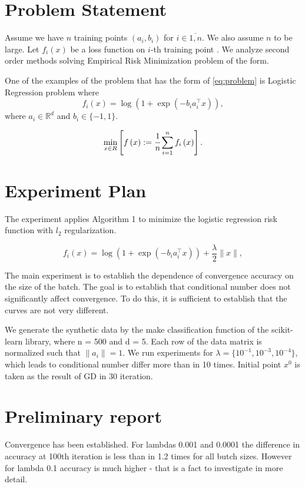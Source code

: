 \documentclass{article}
\begin{document}
\section{Problem Statement}

Assume we have $n$ training points $\left(a_i, b_i\right)$ for $i \in \overline{1, n}$. We also assume $n$ to be large. Let $f_i\left(x\right)$ be a loss function on $i$-th training point . We analyze second order methods solving Empirical Risk Minimization problem of the form.

One of the examples of the problem that has the form of \eqref{eq:problem} is Logistic Regression problem where
\begin{equation}
    f_i(x) = \log\left(1+\exp(-b_i a_i^\top x )\right),
\end{equation}
where $a_i \in \mathbb{R}^d$ and $b_i \in \{-1,1\}.$


\begin{equation}
    \min\limits_{x\in R} \left[f\left(x\right):=\cfrac{1}{n}\sum\limits_{i=1}^{n}f_i\left(x\right)\right].
\end{equation}

\section{Experiment Plan}

The experiment applies Algorithm 1 to minimize the logistic regression risk function with $l_2$ regularization.

\begin{equation}
    f_i(x) = \log\left(1+\exp(-b_i a_i^\top x )\right) + \frac{\lambda}{2}\|x\|,
\end{equation}

The main experiment is to establish the dependence of convergence accuracy on the size of the batch. The goal is to establish that conditional number does not significantly affect convergence. To do this, it is sufficient to establish that the curves are not very different. 

We generate the synthetic data by the make classification function of the scikit-learn library, where n = 500 and d = 5. Each row of the data matrix is normalized such that $\|a_i\| = 1$. We run experiments for $\lambda = \{10^{-1}, 10^{-3}, 10^{-4}\}$, which leads to conditional number differ more than in 10 times.
Initial point $x^0$ is taken as the result of GD in 30 iteration.

\section{Preliminary report}
Convergence has been established. For lambdas 0.001 and 0.0001 the difference in accuracy at 100th iteration is less than in 1.2 times for all butch sizes. However for lambda 0.1 accuracy is much higher - that is a fact to investigate in more detail.
\end{document}
